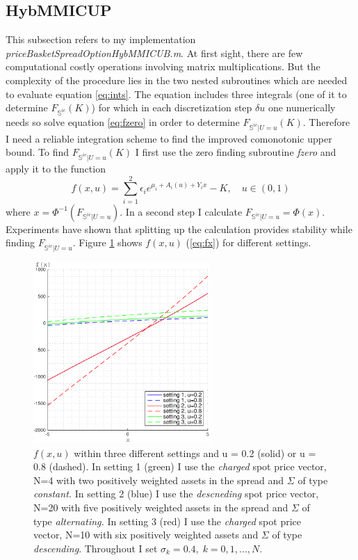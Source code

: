 \documentclass[a4paper]{article}
\begin{document}
\subsection{HybMMICUP}
This subsection refers to my implementation \emph{priceBasketSpreadOptionHybMMICUB.m}. At first sight, there are few computational costly operations involving matrix multiplications. But the complexity of the procedure lies in the two nested subroutines which are needed to evaluate equation \ref{eq:ints}. The equation includes three integrals (one of it to determine $F_{\mathbb{S}^{ic}}(K)$) for which in each discretization step $\delta u$ one numerically needs so solve equation \ref{eq:fzero} in order to determine $F_{\mathbb{S}^{ic}|U=u}(K)$. Therefore I need a reliable integration scheme to find the improved comonotonic upper bound. To find $F_{\mathbb{S}^{ic}|U=u}(K)$ I first use the zero finding subroutine \textit{fzero} and apply it to the function
\begin{equation}
\label{eq:fx}
f(x,u) = \sum_{i=1}^2\epsilon_ie^{\mu_i+A_i(u)+Y_ix}-K, \quad u\in(0,1)
\end{equation}
where $x = \Phi^{-1}(F_{\mathbb{S}^{ic}|U=u})$. In a second step I calculate $F_{\mathbb{S}^{ic}|U=u}=\Phi(x)$. Experiments have shown that splitting up the calculation provides stability while finding $F_{\mathbb{S}^{ic}|U=u}$. 
Figure \ref{fig:fx} shows $f(x,u)$ (\ref{eq:fx}) for different settings. 
\begin{figure}[h!]
	\centering
	\captionsetup{width=.6\linewidth}
	\includegraphics[width=0.6\textwidth]{graphics/fx.pdf}
	\caption{$f(x,u)$ within three different settings and u = 0.2 (solid) or u = 0.8 (dashed). In setting 1 (green) I use the \emph{charged} spot price vector, N=4 with two positively weighted assets in the spread and $\Sigma$ of type \emph{constant.} In setting 2 (blue) I use the \emph{descneding} spot price vector, N=20 with five positively weighted assets in the spread and $\Sigma$ of type \emph{alternating.} In setting 3 (red) I use the \emph{charged} spot price vector, N=10 with six positively weighted assets and $\Sigma$ of type \emph{descending}. Throughout I set $\sigma_k = 0.4, \; k=0,1,...,N$.}
	\label{fig:fx}
\end{figure}
\end{document}
